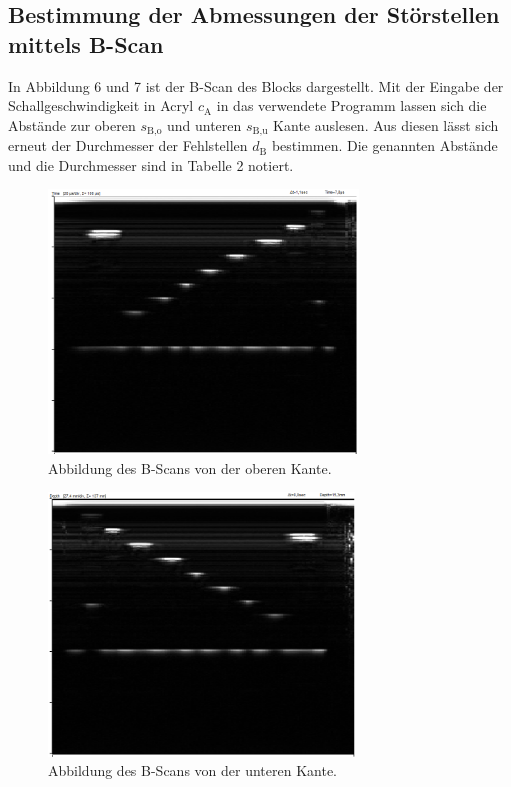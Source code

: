 \subsection{Bestimmung der Abmessungen der Störstellen mittels B-Scan}
In Abbildung 6 und 7 ist der B-Scan des Blocks dargestellt. Mit der Eingabe der Schallgeschwindigkeit in Acryl
$c_\text{A}$ in das verwendete Programm lassen sich die Abstände zur oberen $s_\text{B,o}$ und
unteren $s_\text{B,u}$ Kante auslesen. Aus diesen lässt sich
erneut der Durchmesser der Fehlstellen $d_\text{B}$ bestimmen. Die genannten Abstände und die
Durchmesser sind in Tabelle 2 notiert.

\begin{figure}[H]
  \centering
  \includegraphics[height=7cm]{b-time-1.png}
  \caption{Abbildung des B-Scans von der oberen Kante.}
  \label{fig:acryl}
\end{figure}

\begin{figure}[H]
  \centering
  \includegraphics[height=7cm]{b-time-2.PNG}
  \caption{Abbildung des B-Scans von der unteren Kante.}
  \label{fig:acryl}
\end{figure}

